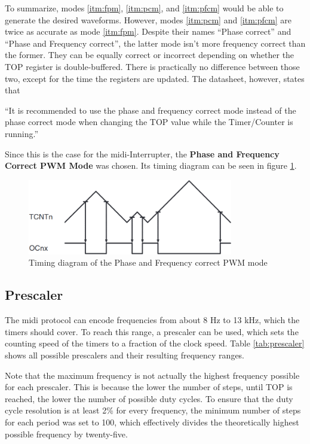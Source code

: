 To summarize, modes \ref{itm:fpm}, \ref{itm:pcm}, and \ref{itm:pfcm} would be able to generate the desired waveforms. However, modes \ref{itm:pcm} and \ref{itm:pfcm} are twice as accurate as mode \ref{itm:fpm}. Despite their names \enquote{Phase correct} and \enquote{Phase and Frequency correct}, the latter mode isn't more frequency correct than the former. They can be equally correct or incorrect depending on whether the TOP register is double-buffered. There is practically no difference between those two, except for the time the registers are updated. The datasheet, however, states that

\begin{displayquote}
\enquote{It is recommended to use the phase and frequency correct mode instead of the phase correct mode when changing the TOP value while the Timer/Counter is running.}
\end{displayquote}

Since this is the case for the \gls{midi}-Interrupter, the \textbf{Phase and Frequency Correct PWM Mode} was chosen. Its timing diagram can be seen in figure \ref{fig:timer_diagram}.

\begin{figure}[h!]
    \centering
    \includegraphics[width=0.8\textwidth]{felix/resources/timer_diagram.png}
    \caption{Timing diagram of the Phase and Frequency correct PWM mode}
    \label{fig:timer_diagram}
\end{figure}

\subsection{Prescaler}

The \gls{midi} protocol can encode frequencies from about 8 Hz to 13 kHz, which the timers should cover. To reach this range, a prescaler can be used, which sets the counting speed of the timers to a fraction of the clock speed. Table \ref{tab:prescaler} shows all possible prescalers and their resulting frequency ranges.

Note that the maximum frequency is not actually the highest frequency possible for each prescaler. This is because the lower the number of steps, until TOP is reached, the lower the number of possible duty cycles. To ensure that the duty cycle resolution is at least 2\% for every frequency, the minimum number of steps for each period was set to 100, which effectively divides the theoretically highest possible frequency by twenty-five.

